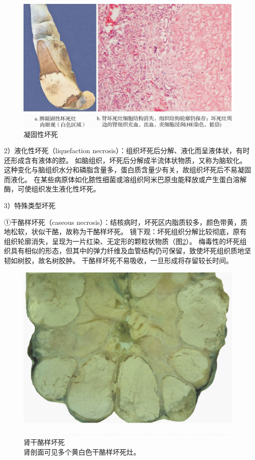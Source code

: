 \begin{figure}[!htbp]
	\centering
    \includegraphics[width=.7\textwidth]{./images/Image00015.jpg}
	\caption{凝固性坏死}
	\label{fig1-14} 
    \end{figure} 

2）液化性坏死（liquefaction
necrosis）：组织坏死后分解、液化而呈液体状，有时还形成含有液体的腔。
如脑组织，坏死后分解成半流体状物质，又称为脑软化。
这种变化与脑组织水分和磷脂含量多，蛋白质含量少有关，故组织坏死后不易凝固而液化。
在某些病原体如化脓性细菌或溶组织阿米巴原虫能释放或产生蛋白溶解酶，可使组织发生液化性坏死。

3）特殊类型坏死

①干酪样坏死（caseous
necrosis）：结核病时，坏死区内脂质较多，颜色带黄，质地松软，状似干酪，故称为干酪样坏死。
镜下观：坏死组织分解比较彻底，原有组织轮廓消失，呈现为一片红染、无定形的颗粒状物质（图\ref{fig1-15}）。
梅毒性的坏死组织具有相似的形态，但其中的弹力纤维及血管结构仍可保留，致使坏死组织质地坚韧如树胶，故名树胶肿。
干酪样坏死不易吸收，一旦形成将存留较长时间。

\begin{figure}[!htbp]
	\centering
    \includegraphics{./images/Image00016.jpg}
	\caption{肾干酪样坏死 \\ {\small 肾剖面可见多个黄白色干酪样坏死灶。}}
	\label{fig1-15} 
    \end{figure} 

